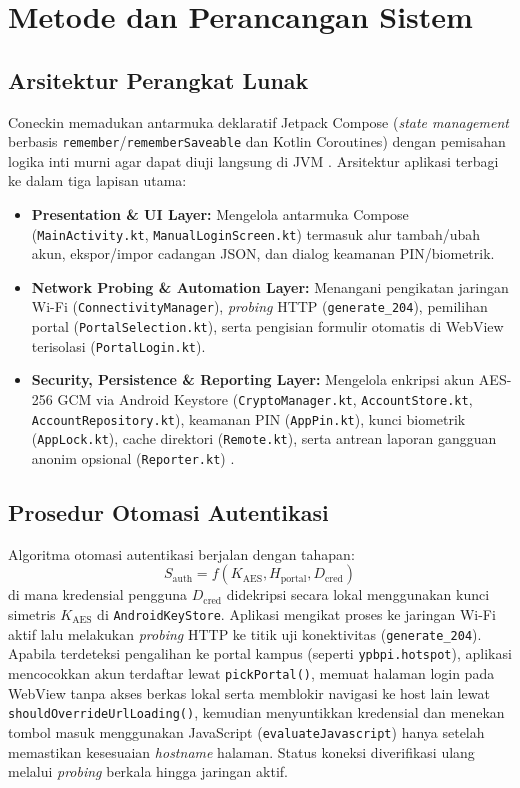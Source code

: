 \documentclass[10pt,journal,compsoc]{IEEEtran}
\begin{document}
\section{Metode dan Perancangan Sistem}

\subsection{Arsitektur Perangkat Lunak}
Coneckin memadukan antarmuka deklaratif Jetpack Compose (\textit{state management} berbasis \texttt{remember}/\texttt{rememberSaveable} dan Kotlin Coroutines) dengan pemisahan logika inti murni agar dapat diuji langsung di JVM \cite{jetpack_compose_study}. Arsitektur aplikasi terbagi ke dalam tiga lapisan utama:
\begin{itemize}
    \item \textbf{Presentation \& UI Layer:} Mengelola antarmuka Compose (\texttt{MainActivity.kt}, \texttt{ManualLoginScreen.kt}) termasuk alur tambah/ubah akun, ekspor/impor cadangan JSON, dan dialog keamanan PIN/biometrik.
    \item \textbf{Network Probing \& Automation Layer:} Menangani pengikatan jaringan Wi-Fi (\texttt{ConnectivityManager}), \textit{probing} HTTP (\texttt{generate\_204}), pemilihan portal (\texttt{PortalSelection.kt}), serta pengisian formulir otomatis di WebView terisolasi (\texttt{PortalLogin.kt}).
    \item \textbf{Security, Persistence \& Reporting Layer:} Mengelola enkripsi akun AES-256 GCM via Android Keystore (\texttt{CryptoManager.kt}, \texttt{AccountStore.kt}, \texttt{AccountRepository.kt}), keamanan PIN (\texttt{AppPin.kt}), kunci biometrik (\texttt{AppLock.kt}), cache direktori (\texttt{Remote.kt}), serta antrean laporan gangguan anonim opsional (\texttt{Reporter.kt}) \cite{android_security_internals}.
\end{itemize}

\subsection{Prosedur Otomasi Autentikasi}
Algoritma otomasi autentikasi berjalan dengan tahapan:
\begin{equation}
    S_{\text{auth}} = f(K_{\text{AES}}, H_{\text{portal}}, D_{\text{cred}})
\end{equation}
di mana kredensial pengguna $D_{\text{cred}}$ didekripsi secara lokal menggunakan kunci simetris $K_{\text{AES}}$ di \texttt{AndroidKeyStore}. Aplikasi mengikat proses ke jaringan Wi-Fi aktif lalu melakukan \textit{probing} HTTP ke titik uji konektivitas (\texttt{generate\_204}). Apabila terdeteksi pengalihan ke portal kampus (seperti \texttt{ypbpi.hotspot}), aplikasi mencocokkan akun terdaftar lewat \texttt{pickPortal()}, memuat halaman login pada WebView tanpa akses berkas lokal serta memblokir navigasi ke host lain lewat \texttt{shouldOverrideUrlLoading()}, kemudian menyuntikkan kredensial dan menekan tombol masuk menggunakan JavaScript (\texttt{evaluateJavascript}) hanya setelah memastikan kesesuaian \textit{hostname} halaman. Status koneksi diverifikasi ulang melalui \textit{probing} berkala hingga jaringan aktif.
\end{document}
